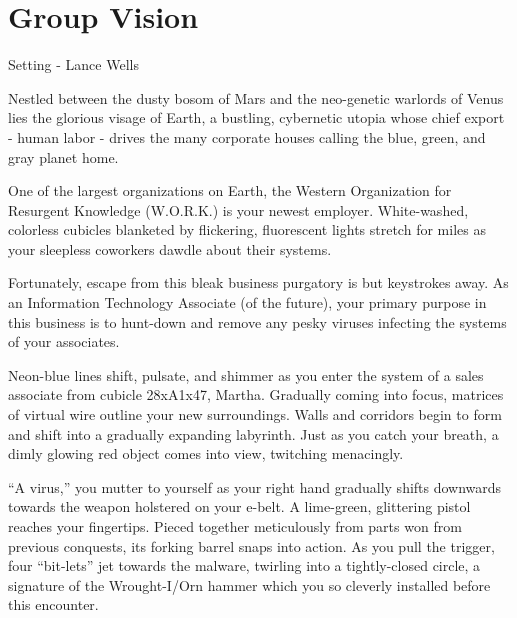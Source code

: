 \documentclass[12pt]{report}
\begin{document}
\chapter{Group Vision}


\begin{section}{Setting - Lance Wells}



\newline

Nestled between the dusty bosom of Mars and the neo-genetic warlords of Venus lies the 
glorious visage of Earth, a bustling, cybernetic utopia whose chief export - human labor 
- drives the many corporate houses calling the blue, green, and gray planet home.

One of the largest organizations on Earth, the Western Organization for Resurgent 
Knowledge (W.O.R.K.) is your newest employer. White-washed, colorless cubicles blanketed 
by flickering, fluorescent lights stretch for miles as your sleepless coworkers dawdle 
about their systems.

Fortunately, escape from this bleak business purgatory is but keystrokes away. As an 
Information Technology Associate (of the future), your primary purpose in this business 
is to hunt-down and remove any pesky viruses infecting the systems of your associates.
\newline

Neon-blue lines shift, pulsate, and shimmer as you enter the system of a sales associate 
from cubicle 28xA1x47, Martha. Gradually coming into focus, matrices of virtual wire 
outline your new surroundings. Walls and corridors begin to form and shift into a gradually 
expanding labyrinth. Just as you catch your breath, a dimly glowing red object comes into 
view, twitching menacingly.

``A virus,'' you mutter to yourself as your right hand gradually shifts downwards towards 
the weapon holstered on your e-belt. A lime-green, glittering pistol reaches your 
fingertips. Pieced together meticulously from parts won from previous conquests, its forking 
barrel snaps into action. As you pull the trigger, four ``bit-lets'' jet towards the malware, 
twirling into a tightly-closed circle, a signature of the Wrought-I/Orn hammer which you so 
cleverly installed before this encounter.


\end{section}
\end{document}
